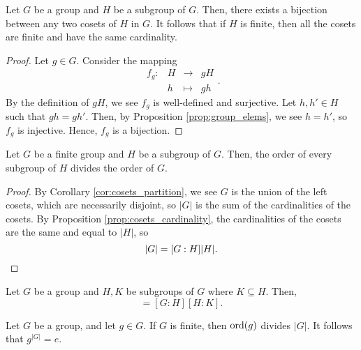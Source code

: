 \begin{prop} \label{prop:cosets_cardinality}
Let $ G $ be a group and $ H $ be a subgroup of $ G $. Then, there exists a bijection between any two cosets of $ H $ in $ G $. It follows that if $ H $ is finite, then all the cosets are finite and have the same cardinality.
\end{prop}
\begin{proof}
Let $ g\in G $. Consider the mapping
\begin{equation*}
    \begin{array}{rccc}
        f_g: & H & \to & gH \\
        & h & \mapsto & gh
    \end{array}.
\end{equation*}
By the definition of $ gH $, we see $ f_g $ is well-defined and surjective. Let $ h,h'\in H $ such that $ gh=gh' $. Then, by Proposition \ref{prop:group_elems}, we see $ h=h' $, so $ f_g $ is injective. Hence, $ f_g $ is a bijection.
\end{proof}

\begin{thm}
Let $ G $ be a finite group and $ H $ be a subgroup of $ G $. Then, the order of every subgroup of $ H $ divides the order of $ G $.
\end{thm}
\begin{proof}
By Corollary \ref{cor:cosets_partition}, we see $ G $ is the union of the left cosets, which are necessarily disjoint, so $ \lvert G\rvert $ is the sum of the cardinalities of the cosets. By Proposition \ref{prop:cosets_cardinality}, the cardinalities of the cosets are the same and equal to $ \lvert H\rvert $, so
\begin{equation*}
    \lvert G\rvert=[G:H]\lvert H\rvert. \qedhere
\end{equation*}
\end{proof}

\begin{cor}
Let $ G $ be a group and $ H,K $ be subgroups of $ G $ where $ K\subseteq H $. Then,
\begin{equation*}
    [G:K]=[G:H][H:K].
\end{equation*}
\end{cor}

\begin{cor}
Let $ G $ be a group, and let $ g\in G $. If $ G $ is finite, then $ \operatorname{ord}(g) $ divides $ \lvert G\rvert $. It follows that $ g^{\lvert G\rvert}=e $.
\end{cor}

